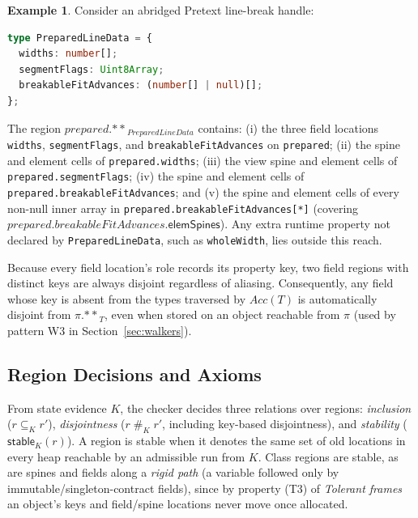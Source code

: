 \documentclass[10pt,a4paper]{article}
\theoremstyle{definition}
\newtheorem{example}[definition]{Example}
\newcommand{\kw}[1]{\mathsf{#1}}
\newcommand{\code}[1]{\textcolor{codec}{\texttt{#1}}}
\newcommand{\sep}{\mathrel{\#}}
\newcommand{\reach}[2]{#1.{\ast\ast}_{#2}}
\begin{document}
\begin{example}
Consider an abridged Pretext line-break handle:
\begin{lstlisting}[language=TypeScript]
type PreparedLineData = {
  widths: number[];
  segmentFlags: Uint8Array;
  breakableFitAdvances: (number[] | null)[];
};
\end{lstlisting}
The region $\reach{\mathit{prepared}}{\mathit{PreparedLineData}}$
contains: (i) the three field locations \code{widths},
\code{segmentFlags}, and \code{breakableFitAdvances} on \code{prepared};
(ii) the spine and element cells of \code{prepared.widths}; (iii) the
view spine and element cells of \code{prepared.segmentFlags}; (iv) the
spine and element cells of \code{prepared.breakableFitAdvances}; and (v)
the spine and element cells of every non-null inner array in
\code{prepared.breakableFitAdvances[*]} (covering
$\mathit{prepared}.\mathit{breakableFitAdvances}.\kw{elemSpines}$).
Any extra runtime property not declared by \code{PreparedLineData}, such
as \code{wholeWidth}, lies outside this reach.
\end{example}

\noindent
Because every field location's role records its property key, two field
regions with distinct keys are always disjoint regardless of aliasing.
Consequently, any field whose key is absent from the types traversed by
$\mathit{Acc}(T)$ is automatically disjoint from $\reach{\pi}{T}$, even
when stored on an object reachable from $\pi$ (used by pattern W3 in
Section~\ref{sec:walkers}).

\subsection{Region Decisions and Axioms}

From state evidence $K$, the checker decides three relations over
regions: \emph{inclusion} ($r\subseteq_K r'$), \emph{disjointness}
($r\sep_K r'$, including key-based disjointness), and \emph{stability}
($\kw{stable}_K(r)$). A region is stable when it denotes the same set of
old locations in every heap reachable by an admissible run from $K$.
Class regions are stable, as are spines and fields along a \emph{rigid
path} (a variable followed only by immutable/singleton-contract fields),
since by property (T3) of \emph{Tolerant frames} an object's keys and
field/spine locations never move once allocated.
\end{document}
